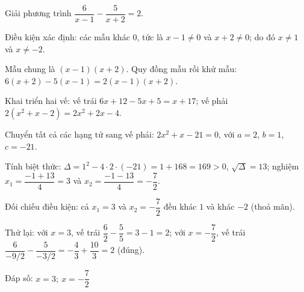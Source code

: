 \begin{problem}[9DS-PT2-040]
Giải phương trình $\dfrac{6}{x - 1} - \dfrac{5}{x + 2} = 2$.

\begin{solution}
Điều kiện xác định: các mẫu khác $0$, tức là $x - 1 \neq 0$ và $x + 2 \neq 0$; do đó $x \neq 1$ và $x \neq -2$.

Mẫu chung là $(x - 1)(x + 2)$. Quy đồng mẫu rồi khử mẫu: $6(x + 2) - 5(x - 1) = 2(x - 1)(x + 2)$.

Khai triển hai vế: vế trái $6x + 12 - 5x + 5 = x + 17$; vế phải $2(x^2 + x - 2) = 2x^2 + 2x - 4$.

Chuyển tất cả các hạng tử sang vế phải: $2x^2 + x - 21 = 0$, với $a = 2$, $b = 1$, $c = -21$.

Tính biệt thức: $\Delta = 1^2 - 4 \cdot 2 \cdot (-21) = 1 + 168 = 169 > 0$, $\sqrt{\Delta} = 13$; nghiệm $x_1 = \dfrac{-1 + 13}{4} = 3$ và $x_2 = \dfrac{-1 - 13}{4} = -\dfrac{7}{2}$.

Đối chiếu điều kiện: cả $x_1 = 3$ và $x_2 = -\dfrac{7}{2}$ đều khác $1$ và khác $-2$ (thoả mãn).

Thử lại: với $x = 3$, vế trái $\dfrac{6}{2} - \dfrac{5}{5} = 3 - 1 = 2$; với $x = -\dfrac{7}{2}$, vế trái $\dfrac{6}{-9/2} - \dfrac{5}{-3/2} = -\dfrac{4}{3} + \dfrac{10}{3} = 2$ (đúng).

Đáp số: $\boxed{x = 3;\ x = -\dfrac{7}{2}}$
\end{solution}
\end{problem}


